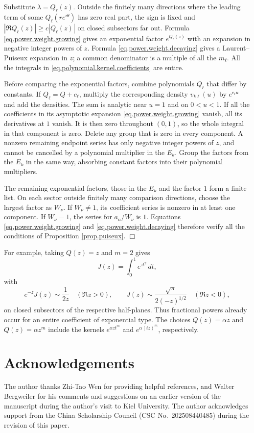 \documentclass[a4paper,12pt]{article}
\newenvironment{proof}
{\noindent{\it Proof.}}{\hfill $\Box$\par\vspace{2.5mm}}
\numberwithin{equation}{section}
\begin{document}
\begin{proof}
Substitute $\lambda=Q_\ell(z)$.
Outside the finitely many directions where the leading term of some
$Q_\ell(re^{i\theta})$ has zero real part, the sign is fixed and
$|\Re Q_\ell(z)|\ge c|Q_\ell(z)|$ on closed subsectors far out.
Formula \eqref{eq.power.weight.growing} gives an exponential factor
$e^{Q_\ell(z)}$ with an expansion in negative integer powers of $z$.
Formula \eqref{eq.power.weight.decaying} gives a Laurent--Puiseux
expansion in $z$; a common denominator is a multiple of all the
$m_\ell$. All the integrals in \eqref{eq.polynomial.kernel.coefficients}
are entire.

Before comparing the exponential factors, combine polynomials $Q_\ell$
that differ by constants. If $Q_\ell=Q+c_\ell$, multiply the corresponding
density $v_{k\ell}(u)$ by $e^{c_\ell u}$ and add the densities.
The sum is analytic near $u=1$ and on $0<u<1$.
If all the coefficients in its asymptotic expansion
\eqref{eq.power.weight.growing} vanish, all its derivatives at $1$
vanish. It is then zero throughout $(0,1)$, so the whole integral
in that component is zero.
Delete any group that is zero in every component.
A nonzero remaining endpoint series has only negative integer powers
of $z$, and cannot be cancelled by a polynomial multiplier in the $E_k$.
Group the factors from the $E_k$ in the same way, absorbing constant
factors into their polynomial multipliers.

The remaining exponential factors, those in the $E_k$ and the factor $1$
form a finite list. On each sector outside finitely many comparison
directions, choose the largest factor as $W_\nu$.
If $W_\nu\ne1$, its coefficient series is nonzero in at least one
component. If $W_\nu=1$, the series for $a_n/W_\nu$ is $1$.
Equations \eqref{eq.power.weight.growing} and
\eqref{eq.power.weight.decaying} therefore verify all the conditions
of Proposition \ref{prop.puiseux}.
\end{proof}

For example, taking $Q(z)=z$ and $m=2$ gives
\[
 J(z)=\int_0^1e^{zt^2}\,dt,
\]
with
\[
 e^{-z}J(z)\sim\frac1{2z}\quad(\Re z>0),
 \qquad
 J(z)\sim\frac{\sqrt\pi}{2(-z)^{1/2}}\quad(\Re z<0),
\]
on closed subsectors of the respective half-planes.
Thus fractional powers already occur for an entire coefficient
of exponential type. The choices $Q(z)=\alpha z$ and
$Q(z)=\alpha z^m$ include the kernels $e^{\alpha zt^m}$ and
$e^{\alpha(tz)^m}$, respectively.

\section*{Acknowledgements}
The author thanks Zhi-Tao Wen for providing helpful references, and
Walter Bergweiler for his comments and suggestions on an earlier version
of the manuscript during the author's visit to Kiel University.
The author acknowledges support from the China Scholarship Council
(CSC No.~202508440485) during the revision of this paper.
\end{document}
